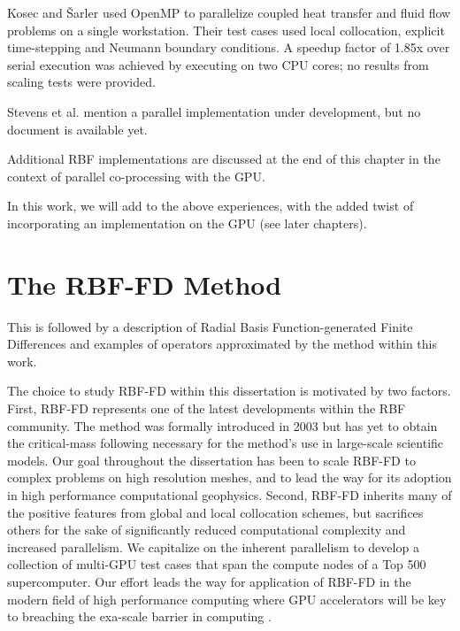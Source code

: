 \documentclass{report}
\begin{document}
{%

Kosec and \v{S}arler \cite{Kosec2008} used OpenMP to parallelize coupled heat transfer 
and fluid flow problems on a single workstation. 
Their test cases used local collocation, explicit time-stepping and Neumann boundary conditions. A speedup 
factor of 1.85x over serial execution was achieved by executing on two CPU cores; no 
results from scaling tests were provided. 

Stevens et al. \cite{Stevens2009a} mention a parallel implementation under development, but no document is available yet. 

Additional RBF implementations are discussed at the end of this chapter in the context of parallel co-processing with the GPU. 

In this work, we will add to the above experiences, with the added twist of incorporating an implementation on the GPU (see later chapters). 


\chapter{The RBF-FD Method}
This is followed by a description of Radial Basis Function-generated Finite Differences and examples of operators approximated by the method within this work.

The choice to study RBF-FD within this dissertation is motivated by two factors. First, RBF-FD represents one of the latest developments within the RBF community. The method was formally introduced in 2003 but has yet to obtain the critical-mass following necessary for the method's use in large-scale scientific models. Our goal throughout the dissertation has been to scale RBF-FD to complex problems on high resolution meshes, and to lead the way for its adoption in high performance computational geophysics. Second, RBF-FD inherits many of the positive features from global and local collocation schemes, but sacrifices others for the sake of significantly reduced computational complexity and increased parallelism. We capitalize on the inherent parallelism to develop a collection of multi-GPU test cases that span the compute nodes of a Top 500 supercomputer. Our effort leads the way for application of RBF-FD in the modern field of high performance computing where GPU accelerators will be key to breaching the exa-scale barrier in computing \cite{GPUandExascale2011}.


}
\end{document}
